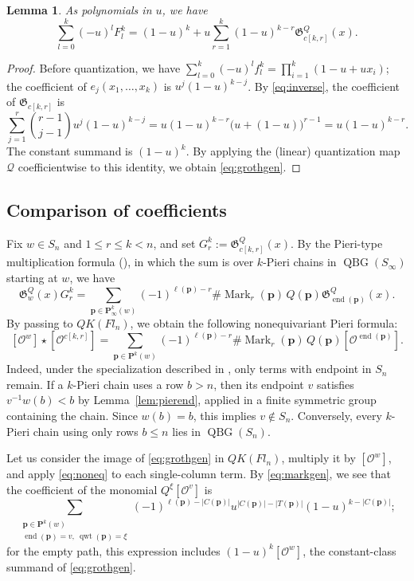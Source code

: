 \documentclass[11pt,a4paper,reqno]{amsart}
\DeclareRobustCommand{\rev}[1]{{\color{revision}#1}}
\numberwithin{equation}{section}
\newtheorem{lemma}[theorem]{Lemma}
\theoremstyle{definition}
\DeclareMathOperator{\QBG}{QBG}
\DeclareMathOperator{\End}{end}
\DeclareMathOperator{\qwt}{qwt}
\DeclareMathOperator{\Mark}{Mark}
\newcommand{\OO}{\mathcal O}
\newcommand{\Sc}[1]{[\OO^{#1}]}
\newcommand{\Pieri}{\mathbf P}
\newcommand{\pp}{\mathbf p}
\newcommand{\GG}{\mathfrak G}
\begin{document}
\begin{lemma}\label{lem:grothgen}
As polynomials in \(u\), we have 
\begin{equation}\label{eq:grothgen}
 \sum_{l=0}^k(-u)^lF_l^k=(1-u)^k+
       u\sum_{r=1}^k(1-u)^{k-r}\GG_{c[k,r]}^Q(x).
\end{equation}
\end{lemma}
\begin{proof}
\rev{Before quantization, we have \(\sum_{l=0}^{k}(-u)^lf_l^k=\prod_{i=1}^k(1-u+ux_i)\);}
the coefficient of \(e_j(x_1,\ldots,x_k)\) is \(u^j(1-u)^{k-j}\). By \eqref{eq:inverse}, the coefficient of \(\GG_{c[k,r]}\) is
\[
 \sum_{j=1}^r\binom{r-1}{j-1}u^j(1-u)^{k-j}
  =u(1-u)^{k-r}\big(u+(1-u)\big)^{r-1}=u(1-u)^{k-r}.
\]
The constant summand is \((1-u)^k\). By applying the (linear) quantization map \(\mathcal Q\) coefficientwise to this identity, we obtain \eqref{eq:grothgen}.
\end{proof}

\subsection{Comparison of coefficients}
Fix \(w\in S_n\) and \(1\le r\le k<n\), and set
\(G_r^k:=\GG_{c[k,r]}^Q(x)\). By the Pieri-type multiplication formula (\cite[Theorem~2.13]{NS}), in which the sum is over
\(k\)-Pieri chains in \(\QBG(S_\infty)\) starting at \(w\), we have
\[
 \GG_w^Q(x)G_r^k
 =\sum_{\pp\in\Pieri^k_\infty(w)}(-1)^{\ell(\pp)-r}\#\Mark_r(\pp)\,
       Q(\pp)\GG^Q_{\End(\pp)}(x).
\]
By passing to \(QK(Fl_n)\), we obtain the following nonequivariant Pieri formula:
\begin{equation}\label{eq:noneq}
 \Sc{w}\star\Sc{c[k,r]}=
 \sum_{\pp\in\Pieri^k(w)}(-1)^{\ell(\pp)-r}
   \#\Mark_r(\pp)\,Q(\pp)\Sc{\End(\pp)}.
\end{equation}
Indeed, under the specialization described in \cite[Introduction]{NS},
only terms with endpoint in \(S_n\) remain. If a \(k\)-Pieri chain uses a row
\(b>n\), then its endpoint \(v\) satisfies \(v^{-1}w(b)<b\) by
Lemma~\ref{lem:pierend}, applied in a finite symmetric group containing
the chain. Since \(w(b)=b\), this implies \(v\notin S_n\). Conversely,
every \(k\)-Pieri chain using only rows \(b\le n\) lies in \(\QBG(S_n)\).

Let us consider the image of \eqref{eq:grothgen} in \(QK(Fl_n)\), multiply it by \(\Sc{w}\), and apply \eqref{eq:noneq} to each single-column term. By \eqref{eq:markgen}, we see that the coefficient of the monomial \(Q^\xi\Sc{v}\) is
\begin{equation}\label{eq:comp}
 \sum_{\substack{\pp\in\Pieri^k(w)\\ \End(\pp)=v,\ \qwt(\pp)=\xi}}
 (-1)^{\ell(\pp)-|C(\pp)|}
 u^{|C(\pp)|-|T(\pp)|}(1-u)^{k-|C(\pp)|};
\end{equation}
for the empty path, this expression includes \((1-u)^k\Sc{w}\), the constant-class summand of \eqref{eq:grothgen}.
\end{document}

